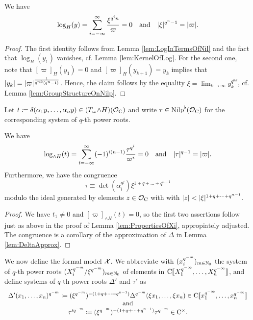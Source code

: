 \documentclass[../main.tex]{subfiles}
\begin{document}
\begin{lem}\label{lem:PropertiesOfXi}
  We have 
  \begin{equation*}
    \log_H(y) = \sum_{i = -\infty}^ \infty \frac{\xi^{q^in}}{\varpi} = 0
    \quad \text{and} \quad
    \lvert \xi \rvert^{q^n-1} = \lvert \varpi \rvert.
  \end{equation*}
\begin{proof}
  The first identity follows from Lemma \ref{lem:LogInTermsOfNil} and the fact that
  $\log_H(y_1)$ vanishes, cf. Lemma \ref{lem:KernelOfLog}. 
  For the second one, note that $[\varpi]_H(y_1) = 0$ and 
  $[\varpi]_H(y_{k+1}) = y_k$ implies that 
  $\lvert y_k \rvert = \lvert \varpi \rvert^{\frac{1}{q^{nk}(q^n-1)}}$. Hence, the claim follows by
  the equality $\xi = \lim_{k \to \infty} y_k^{q^{nk}}$, cf. Lemma
  \ref{lem:GroupStructureOnNilp}.
\end{proof}
\end{lem}

Let $t \coloneq \delta(\alpha_1 y, \dots, \alpha_n y) \in (T_\varpi {\wedge H})(\mathcal{O}_{\mathrm{C}})$
and write $\tau \in {\mathrm{Nilp}}^\flat(\mathcal{O}_{\mathrm{C}})$ for the corresponding system of $q$-th 
power roots.

\begin{lem}\label{lem:PropertiesOfTau}
  We have 
  \begin{equation*}
    \log_{\wedge H}(t) = \sum_{i = -\infty}^\infty (-1)^{i(n-1)} \frac{\tau^{q^i}}{\varpi^i} = 0
    \quad \text{and} \quad
    \lvert \tau \rvert^{q-1} = \lvert \varpi \rvert.
  \end{equation*}
  Furthermore, we have the congruence
  \begin{equation*}
    \tau \equiv \det(\alpha_i^{q^j}) \xi^{1 + q + \dots + q^{n-1}}
  \end{equation*}
  modulo the ideal generated by elements $z \in \mathcal{O}_{\mathrm{C}}$ with with 
  $\lvert z \rvert < \lvert \xi \rvert^{1 + q + \dots + q^{n-1}}$. 
\begin{proof}
  We have $t_1 \neq 0$ and $[\varpi]_{\wedge H}(t) = 0$, so the first two
  assertions follow just as above in the proof of Lemma
  \ref{lem:PropertiesOfXi}, appropiately adjusted. The congruence is a
  corollary of the approximation of $\Delta$ in Lemma \ref{lem:DeltaApprox}.
\end{proof}
\end{lem}

We now define the formal model $\mathcal{X}$. We abbreviate with $(x_i^{q^{-m}})_{m \in
\mathbb{N}_0}$ the system of 
$q$-th power roots $(X_i^{q^{-m}}/\xi^{q^{-m}})_{m \in \mathbb{N}_0}$ of elements in
${\mathrm{C}} \llbracket X_1^{q^{-\infty}}, \dots, X_n^{q^{-\infty}}\rrbracket$, and define
systems of $q$-th power roots $\Delta'$ and $\tau'$ as
\begin{equation*}
  \begin{array}c
  \Delta'(x_1, \dots, x_n)^{q^{-m}} \coloneq (\xi^{q^{-m}})^{-(1 + q + \dots +
  q^{n-1})} \Delta^{q^{-m}}(\xi x_1, \dots, \xi x_n) \in \Cp \llbr x_1^{q^{-\infty}}, \dots
  , x_n^{q^{-\infty}}\rrbr  \\
  \text{and} \\
  \tau'^{q^{-m}} \coloneq (\xi^{q^{-m}})^{-(1 + q + \dots + q^{n-1})} \tau^{q^{-m}} \in
  \Cp^\times.
  \end{array}
\end{equation*}
\end{document}
